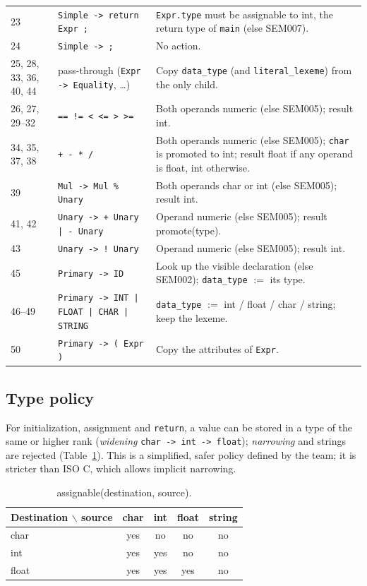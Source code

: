 \documentclass[11pt,letterpaper]{article}
\let\oldsubsection\subsection
\renewcommand{\subsection}{\needspace{6\baselineskip}\oldsubsection}
\begin{document}
{\begin{longtable}{@{}p{1.6cm}p{4.3cm}p{9.2cm}@{}}
23 & \texttt{Simple -> return Expr ;} & \texttt{Expr.type} must be assignable to int, the return type of \texttt{main} (else SEM007). \\
24 & \texttt{Simple -> ;} & No action. \\
25, 28, 33, 36, 40, 44 & pass-through (\texttt{Expr -> Equality}, \dots) & Copy \texttt{data\_type} (and \texttt{literal\_lexeme}) from the only child. \\
26, 27, 29--32 & \texttt{== != < <= > >=} & Both operands numeric (else SEM005); result int. \\
34, 35, 37, 38 & \texttt{+ - * /} & Both operands numeric (else SEM005); \texttt{char} is promoted to int; result float if any operand is float, int otherwise. \\
39 & \texttt{Mul -> Mul \% Unary} & Both operands char or int (else SEM005); result int. \\
41, 42 & \texttt{Unary -> + Unary | - Unary} & Operand numeric (else SEM005); result promote(type). \\
43 & \texttt{Unary -> ! Unary} & Operand numeric (else SEM005); result int. \\
45 & \texttt{Primary -> ID} & Look up the visible declaration (else SEM002); \texttt{data\_type} $:=$ its type. \\
46--49 & \texttt{Primary -> INT | FLOAT | CHAR | STRING} & \texttt{data\_type} $:=$ int / float / char / string; keep the lexeme. \\
50 & \texttt{Primary -> ( Expr )} & Copy the attributes of \texttt{Expr}. \\
\bottomrule
\end{longtable}
}

\subsection{Type policy}

For initialization, assignment and \texttt{return}, a value can be stored in
a type of the same or higher rank (\emph{widening}
\texttt{char -> int -> float}); \emph{narrowing} and strings are rejected
(Table~\ref{tab:assign}). This is a simplified, safer policy defined by the
team; it is stricter than ISO C, which allows implicit narrowing.

\begin{table}[!htbp]
\centering
\caption{assignable(destination, source).}
\label{tab:assign}
\begin{tabular}{@{}lcccc@{}}
\toprule
\textbf{Destination $\backslash$ source} & \textbf{char} & \textbf{int} & \textbf{float} & \textbf{string}\\
\midrule
char  & yes & no  & no  & no \\
int   & yes & yes & no  & no \\
float & yes & yes & yes & no \\
\bottomrule
\end{tabular}
\end{table}
\end{document}

